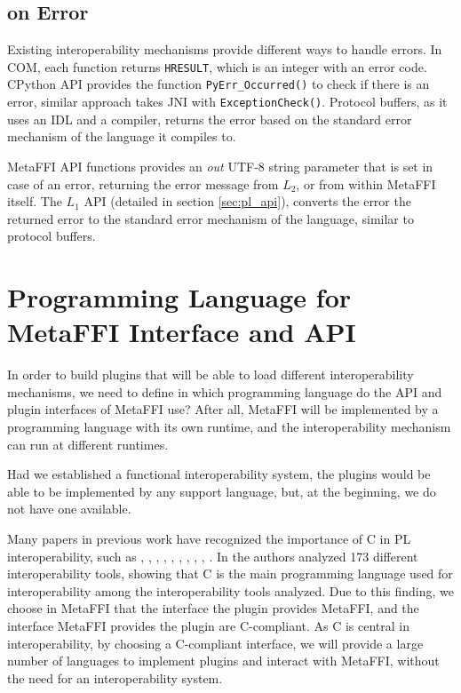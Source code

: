 \documentclass[sigplan,10pt,manuscript,nonacm]{acmart}
\begin{document}
\subsection{on Error}
Existing interoperability mechanisms provide different ways to handle errors. In COM, each function returns \texttt{HRESULT}, which is an integer with an error code. CPython API provides the function \texttt{PyErr\_Occurred()} to check if there is an error, similar approach takes JNI with \texttt{ExceptionCheck()}. Protocol buffers, as it uses an IDL and a compiler, returns the error based on the standard error mechanism of the language it compiles to.

MetaFFI API functions provides an \textit{out} UTF-8 string parameter that is set in case of an error, returning the error message from $L_2$, or from within MetaFFI itself. The $L_1$ API (detailed in section \ref{sec:pl_api}), converts the error the returned error to the standard error mechanism of the language, similar to protocol buffers.



\section{Programming Language for MetaFFI Interface and API} \label{sec:pl_for_metaffi}

In order to build plugins that will be able to load different interoperability mechanisms, we need to define in which programming language do the API and plugin interfaces of MetaFFI use? After all, MetaFFI will be implemented by a programming language with its own runtime, and the interoperability mechanism can run at different runtimes.

Had we established a functional interoperability system, the plugins would be able to be implemented by any support language, but, at the beginning, we do not have one available.

Many papers in previous work have recognized the importance of C in PL interoperability, such as \cite{toward_description_of_interop}, \cite{100k_opensource}, \cite{challenges_of_interop}, \cite{code_migration}, \cite{trufflevm}, \cite{multilingual_systems_constructed}, \cite{demystifying_issues}, \cite{issue_challenges_solutions}, \cite{interop_by_pl}, \cite{app_ffi_gen}. In \cite{empirical_multi_lingual} the authors analyzed 173 different interoperability tools, showing that C is the main programming language used for interoperability among the interoperability tools analyzed. Due to this finding, we choose in MetaFFI that the interface the plugin provides MetaFFI, and the interface MetaFFI provides the plugin are C-compliant. As C is central in interoperability, by choosing a C-compliant interface, we will provide a large number of languages to implement plugins and interact with MetaFFI, without the need for an interoperability system.
\end{document}
